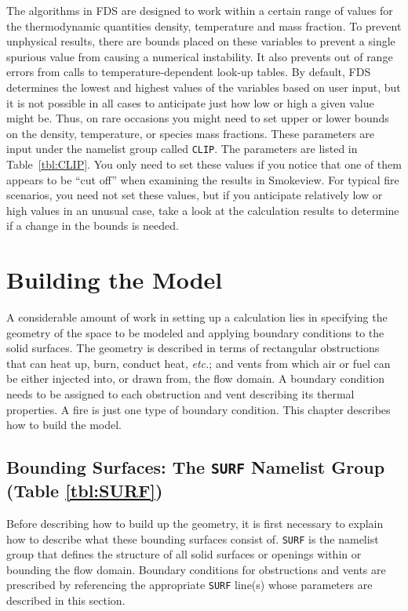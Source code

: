 \documentclass[11pt]{book}
\newcommand{\ct}{\tt\small}
\begin{document}
The algorithms in FDS are designed to work within a certain range of values for the thermodynamic quantities density, temperature and mass fraction. To prevent unphysical results,
there are bounds placed on these variables to prevent a single spurious value from causing a numerical instability. It also prevents out of range
errors from calls to temperature-dependent look-up tables. By default, FDS determines the lowest and highest values of the variables based on user input, but it is not
possible in all cases to anticipate just how low or high a given value might be. Thus,
on rare occasions you might need to set upper or lower bounds on the density, temperature, or species mass fractions. These parameters are input under the
namelist group called {\ct CLIP}. The parameters are listed in Table~\ref{tbl:CLIP}. You only need to set these values if you notice that one of them appears to be
``cut off'' when examining the results in Smokeview. For typical fire scenarios, you need not set these values, but if you anticipate relatively low or high values in an
unusual case, take a look at the calculation results to determine if a change in the bounds is needed.








\chapter{Building the Model}

A considerable amount of work in setting up a calculation lies in specifying the
geometry of the space to be modeled and applying boundary conditions
to the solid surfaces. The geometry is described in terms
of rectangular obstructions that can heat up, burn, conduct heat, {\em etc.};
and vents from which air or fuel can be
either injected into, or drawn from, the flow domain.
A boundary condition needs to be assigned to each obstruction
and vent describing its thermal properties. A fire is just one type of
boundary condition. This chapter describes how to build the model.


\section{Bounding Surfaces: The \texorpdfstring{{\tt SURF}}{SURF} Namelist Group (Table \ref{tbl:SURF})}
\label{info:SURF}

Before describing how to build up the geometry, it is first necessary to explain how to describe what these bounding surfaces
consist of. {\ct SURF} is the namelist group that defines
the structure of all solid surfaces or openings within or
bounding the flow domain. Boundary conditions for obstructions and vents are
prescribed by referencing the appropriate {\ct SURF} line(s) whose
parameters are described in this section.
\end{document}
